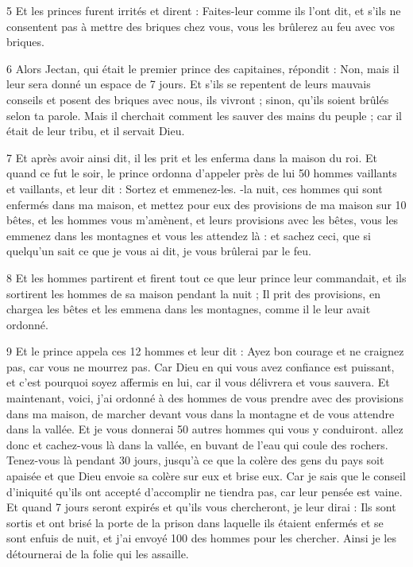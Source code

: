 \par 5 Et les princes furent irrités et dirent : Faites-leur comme ils l'ont dit, et s'ils ne consentent pas à mettre des briques chez vous, vous les brûlerez au feu avec vos briques.

\par 6 Alors Jectan, qui était le premier prince des capitaines, répondit : Non, mais il leur sera donné un espace de 7 jours. Et s’ils se repentent de leurs mauvais conseils et posent des briques avec nous, ils vivront ; sinon, qu'ils soient brûlés selon ta parole. Mais il cherchait comment les sauver des mains du peuple ; car il était de leur tribu, et il servait Dieu.

\par 7 Et après avoir ainsi dit, il les prit et les enferma dans la maison du roi. Et quand ce fut le soir, le prince ordonna d'appeler près de lui 50 hommes vaillants et vaillants, et leur dit : Sortez et emmenez-les. -la nuit, ces hommes qui sont enfermés dans ma maison, et mettez pour eux des provisions de ma maison sur 10 bêtes, et les hommes vous m'amènent, et leurs provisions avec les bêtes, vous les emmenez dans les montagnes et vous les attendez là : et sachez ceci, que si quelqu'un sait ce que je vous ai dit, je vous brûlerai par le feu.

\par 8 Et les hommes partirent et firent tout ce que leur prince leur commandait, et ils sortirent les hommes de sa maison pendant la nuit ; Il prit des provisions, en chargea les bêtes et les emmena dans les montagnes, comme il le leur avait ordonné.

\par 9 Et le prince appela ces 12 hommes et leur dit : Ayez bon courage et ne craignez pas, car vous ne mourrez pas. Car Dieu en qui vous avez confiance est puissant, et c'est pourquoi soyez affermis en lui, car il vous délivrera et vous sauvera. Et maintenant, voici, j'ai ordonné à des hommes de vous prendre avec des provisions dans ma maison, de marcher devant vous dans la montagne et de vous attendre dans la vallée. Et je vous donnerai 50 autres hommes qui vous y conduiront. allez donc et cachez-vous là dans la vallée, en buvant de l'eau qui coule des rochers. Tenez-vous là pendant 30 jours, jusqu'à ce que la colère des gens du pays soit apaisée et que Dieu envoie sa colère sur eux et brise eux. Car je sais que le conseil d’iniquité qu’ils ont accepté d’accomplir ne tiendra pas, car leur pensée est vaine. Et quand 7 jours seront expirés et qu'ils vous chercheront, je leur dirai : Ils sont sortis et ont brisé la porte de la prison dans laquelle ils étaient enfermés et se sont enfuis de nuit, et j'ai envoyé 100 des hommes pour les chercher. Ainsi je les détournerai de la folie qui les assaille.

